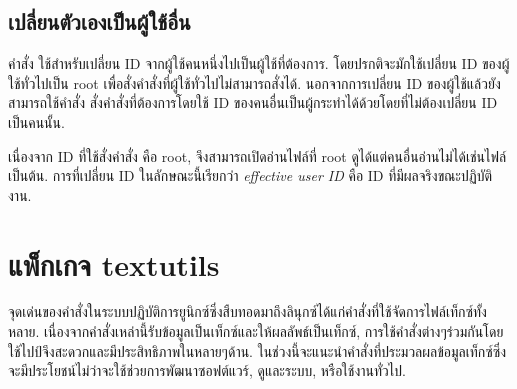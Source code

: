\begin{thwbr}
\subsection{เปลี่ยนตัวเองเป็นผู้ใช้อื่น}
คำสั่ง  ใช้สำหรับเปลี่ยน ID จากผู้ใช้คนหนึ่งไปเป็นผู้ใช้ที่ต้องการ. โดยปรกติจะมักใช้เปลี่ยน ID ของผู้ใช้ทั่วไปเป็น root เพื่อสั่งคำสั่งที่ผู้ใช้ทั่วไปไม่สามารถสั่งได้. นอกจากการเปลี่ยน ID ของผู้ใช้แล้วยังสามารถใช้คำสั่ง  สั่งคำสั่งที่ต้องการโดยใช้ ID ของคนอื่นเป็นผู้กระทำได้ด้วยโดยที่ไม่ต้องเปลี่ยน ID เป็นคนนั้น. 

\begin{MyExample}
\end{MyExample}%
เนื่องจาก ID ที่ใช้สั่งคำสั่ง  คือ root, จึงสามารถเปิดอ่านไฟล์ที่ root ดูได้แต่คนอื่นอ่านไม่ได้เช่นไฟล์  เป็นต้น. การที่เปลี่ยน ID ในลักษณะนี้เรียกว่า \emph{effective user ID} คือ ID ที่มีผลจริงขณะปฏิบัติงาน. 


\section{แพ็กเกจ textutils}
จุดเด่นของคำสั่งในระบบปฏิบัติการยูนิกซ์ซึ่งสืบทอดมาถึงลินุกซ์ได้แก่คำสั่งที่ใช้จัดการไฟล์เท็กซ์ทั้งหลาย. เนื่องจากคำสั่งเหล่านี้รับข้อมูลเป็นเท็กซ์และให้ผลลัพธ์เป็นเท็กซ์, การใช้คำสั่งต่างๆร่วมกันโดยใช้ไปป์จึงสะดวกและมีประสิทธิภาพในหลายๆด้าน. ในช่วงนี้จะแนะนำคำสั่งที่ประมวลผลข้อมูลเท็กซ์ซึ่งจะมีประโยชน์ไม่ว่าจะใช้ช่วยการพัฒนาซอฟต์แวร์, ดูและระบบ, หรือใช้งานทั่วไป. 



\end{thwbr}
